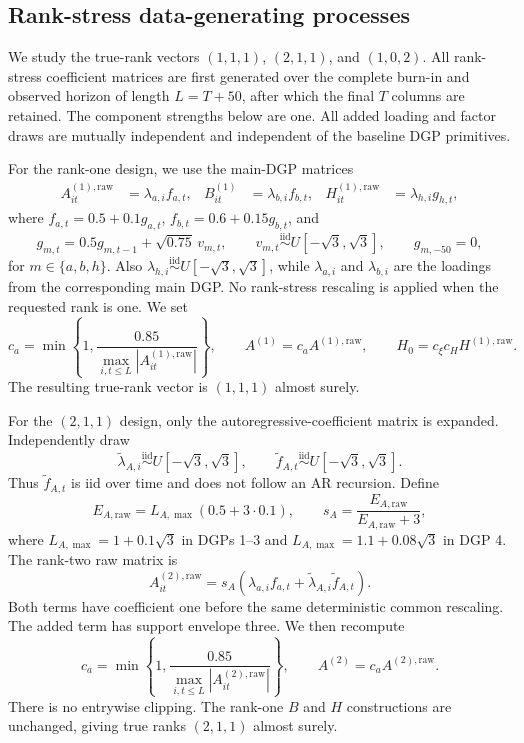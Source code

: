\subsection{Rank-stress data-generating processes}
\label{app:rank-stress-dgps}

We study the true-rank vectors $(1,1,1)$, $(2,1,1)$, and
$(1,0,2)$.  All rank-stress coefficient matrices are first generated over
the complete burn-in and observed horizon of length $L=T+50$, after which
the final $T$ columns are retained.  The component strengths below are one.
All added loading and factor draws are mutually independent and independent
of the baseline DGP primitives.

For the rank-one design, we use the main-DGP matrices
\begin{align*}
 A_{it}^{(1),\mathrm{raw}}&=\lambda_{a,i}f_{a,t}, &
 B_{it}^{(1)}&=\lambda_{b,i}f_{b,t}, &
 H_{it}^{(1),\mathrm{raw}}&=\lambda_{h,i}g_{h,t},
\end{align*}
where $f_{a,t}=0.5+0.1g_{a,t}$,
$f_{b,t}=0.6+0.15g_{b,t}$, and
\[
 g_{m,t}=0.5g_{m,t-1}+\sqrt{0.75}\,v_{m,t},\qquad
 v_{m,t}\stackrel{\mathrm{iid}}{\sim}U[-\sqrt{3},\sqrt{3}],
 \qquad g_{m,-50}=0,
\]
for $m\in\{a,b,h\}$.  Also
$\lambda_{h,i}\stackrel{\mathrm{iid}}{\sim}U[-\sqrt{3},\sqrt{3}]$,
while $\lambda_{a,i}$ and $\lambda_{b,i}$ are the loadings from the
corresponding main DGP.  No rank-stress rescaling is applied when the
requested rank is one.  We set
\[
 c_a=\min\left\{1,
 \frac{0.85}{\max_{i,t\leq L}|A_{it}^{(1),\mathrm{raw}}|}\right\},
 \qquad A^{(1)}=c_aA^{(1),\mathrm{raw}},
 \qquad H_0=c_\xi c_H H^{(1),\mathrm{raw}}.
\]
The resulting true-rank vector is $(1,1,1)$ almost surely.

For the $(2,1,1)$ design, only the autoregressive-coefficient matrix is
expanded.  Independently draw
\[
 \widetilde\lambda_{A,i}\stackrel{\mathrm{iid}}{\sim}
 U[-\sqrt{3},\sqrt{3}],\qquad
 \widetilde f_{A,t}\stackrel{\mathrm{iid}}{\sim}
 U[-\sqrt{3},\sqrt{3}].
\]
Thus $\widetilde f_{A,t}$ is iid over time and does not follow an AR
recursion.  Define
\[
 E_{A,\mathrm{raw}}
 =L_{A,\max}(0.5+3\cdot0.1),\qquad
 s_A=\frac{E_{A,\mathrm{raw}}}{E_{A,\mathrm{raw}}+3},
\]
where $L_{A,\max}=1+0.1\sqrt{3}$ in DGPs 1--3 and
$L_{A,\max}=1.1+0.08\sqrt{3}$ in DGP 4.  The rank-two raw matrix is
\[
 A_{it}^{(2),\mathrm{raw}}
 =s_A\left(\lambda_{a,i}f_{a,t}
 +\widetilde\lambda_{A,i}\widetilde f_{A,t}\right).
\]
Both terms have coefficient one before the same deterministic common
rescaling.  The added term has support envelope three.  We then recompute
\[
 c_a=\min\left\{1,
 \frac{0.85}{\max_{i,t\leq L}|A_{it}^{(2),\mathrm{raw}}|}\right\},
 \qquad A^{(2)}=c_aA^{(2),\mathrm{raw}}.
\]
There is no entrywise clipping.  The rank-one $B$ and $H$ constructions
are unchanged, giving true ranks $(2,1,1)$ almost surely.

